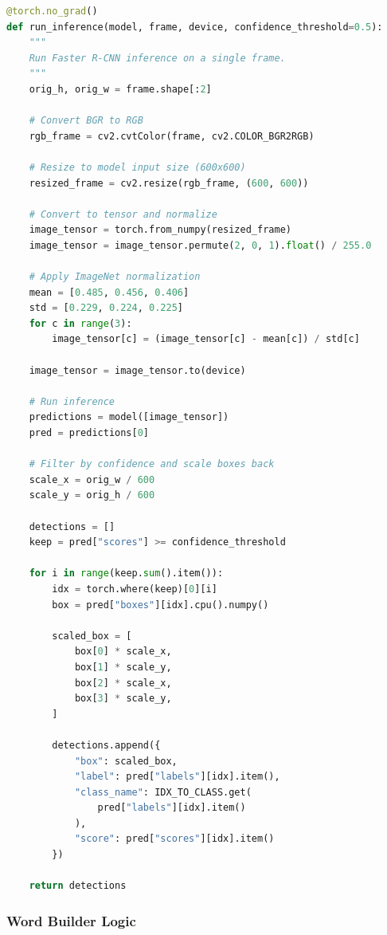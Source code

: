 \documentclass[12pt,a4paper]{article}
\begin{document}
\begin{lstlisting}[language=python, caption=Real-time Inference Function]
@torch.no_grad()
def run_inference(model, frame, device, confidence_threshold=0.5):
    """
    Run Faster R-CNN inference on a single frame.
    """
    orig_h, orig_w = frame.shape[:2]
    
    # Convert BGR to RGB
    rgb_frame = cv2.cvtColor(frame, cv2.COLOR_BGR2RGB)
    
    # Resize to model input size (600x600)
    resized_frame = cv2.resize(rgb_frame, (600, 600))
    
    # Convert to tensor and normalize
    image_tensor = torch.from_numpy(resized_frame)
    image_tensor = image_tensor.permute(2, 0, 1).float() / 255.0
    
    # Apply ImageNet normalization
    mean = [0.485, 0.456, 0.406]
    std = [0.229, 0.224, 0.225]
    for c in range(3):
        image_tensor[c] = (image_tensor[c] - mean[c]) / std[c]
    
    image_tensor = image_tensor.to(device)
    
    # Run inference
    predictions = model([image_tensor])
    pred = predictions[0]
    
    # Filter by confidence and scale boxes back
    scale_x = orig_w / 600
    scale_y = orig_h / 600
    
    detections = []
    keep = pred["scores"] >= confidence_threshold
    
    for i in range(keep.sum().item()):
        idx = torch.where(keep)[0][i]
        box = pred["boxes"][idx].cpu().numpy()
        
        scaled_box = [
            box[0] * scale_x,
            box[1] * scale_y,
            box[2] * scale_x,
            box[3] * scale_y,
        ]
        
        detections.append({
            "box": scaled_box,
            "label": pred["labels"][idx].item(),
            "class_name": IDX_TO_CLASS.get(
                pred["labels"][idx].item()
            ),
            "score": pred["scores"][idx].item()
        })
    
    return detections
\end{lstlisting}

\subsubsection{Word Builder Logic}
\end{document}
